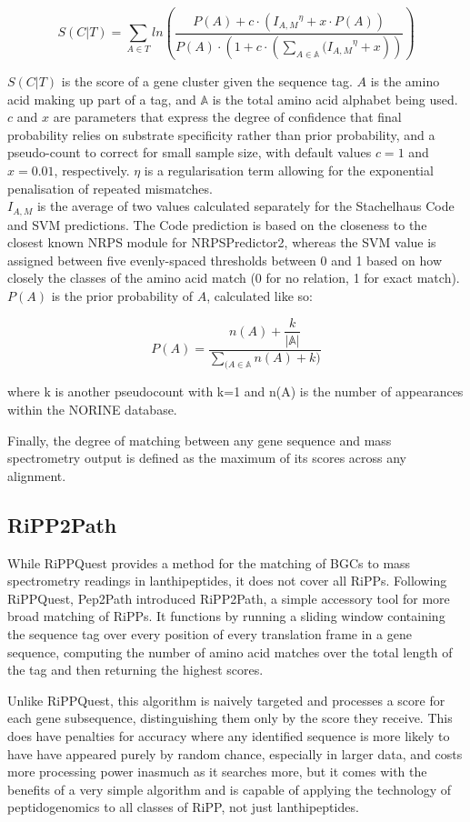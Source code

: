 \documentclass{l4proj}
\newcommand{\cit}[1]{\citep{#1}}
\newcommand{\pa}{\[P(A) = \dfrac{n(A) + \dfrac{k}{|\mathbb{A}|}}{\sum_{(A \in \mathbb{A}}{n(A) + k})}\]}
\newcommand{\scoreeqn}{\[S(C|T) = \sum_{A \in T}{ln\left(\dfrac{
												    P(A) + c\cdot ({I_{A, M}}^\eta + x\cdot {P(A)})
												    }{P(A)\cdot(1 + c \cdot (\sum_{A \in \mathbb{A}}{({I_{A, M}}^\eta} + x))
												    }\right)}\]}
\begin{document}
\scoreeqn

\(S(C|T)\) is the score of a gene cluster given the sequence tag. \(A\) is the amino acid making up part of a tag, and \(\mathbb{A}\) is the total amino acid alphabet being used. \(c\) and \(x\) are parameters that express the degree of confidence that final probability relies on substrate specificity rather than prior probability, and a pseudo-count to correct for small sample size, with default values \(c=1\) and \(x=0.01\), respectively. \(\eta\) is a regularisation term allowing for the exponential penalisation of repeated mismatches. \\

\(I_{A, M}\) is the average of two values calculated separately for the Stachelhaus Code and SVM predictions. The Code prediction is based on the closeness to the closest known NRPS module for NRPSPredictor2, whereas the SVM value is assigned between five evenly-spaced thresholds between 0 and 1 based on how closely the classes of the amino acid match (0 for no relation, 1 for exact match). \\

\(P(A)\) is the prior probability of \(A\), calculated like so:

\pa

where k is another pseudocount with k=1 and n(A) is the number of appearances within the NORINE database. \cit{norine}

Finally, the degree of matching between any gene sequence and mass spectrometry output is defined as the maximum of its scores across any alignment.

\subsection{RiPP2Path}

While RiPPQuest provides a method for the matching of BGCs to mass spectrometry readings in lanthipeptides, it does not cover all RiPPs. Following RiPPQuest, Pep2Path introduced RiPP2Path, a simple accessory tool for more broad matching of RiPPs. It functions by running a sliding window containing the sequence tag over every position of every translation frame in a gene sequence, computing the number of amino acid matches over the total length of the tag and then returning the highest scores.

Unlike RiPPQuest, this algorithm is naively targeted and processes a score for each gene subsequence, distinguishing them only by the score they receive. This does have penalties for accuracy where any identified sequence is more likely to have have appeared purely by random chance, especially in larger data, and costs more processing power inasmuch as it searches more, but it comes with the benefits of a very simple algorithm and is capable of applying the technology of peptidogenomics to all classes of RiPP, not just lanthipeptides.
\end{document}
